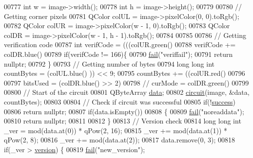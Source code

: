 \begin{DoxyCode}
00777     \textcolor{keywordtype}{int} w = image->width();
00778     \textcolor{keywordtype}{int} h = image->height();
00779 
00780     \textcolor{comment}{// Getting corner pixels}
00781     QColor colUL = image->pixelColor(0, 0).toRgb();
00782     QColor colUR = image->pixelColor(w - 1, 0).toRgb();
00783     QColor colDR = image->pixelColor(w - 1, h - 1).toRgb();
00784 
00785 
00786     \textcolor{comment}{// Getting verification code}
00787     \textcolor{keywordtype}{int} verifCode = (((colUR.green() %
00788     verifCode += colDR.blue() %
00789     \textcolor{keywordflow}{if}(verifCode != 166)\{
00790         \hyperlink{class_model_p_c_a47464b59b7e37fcee25e55475708aabd}{fail}(\textcolor{stringliteral}{"veriffail"});
00791         \textcolor{keywordflow}{return} \textcolor{keyword}{nullptr};
00792     \}
00793     \textcolor{comment}{// Getting number of bytes}
00794     \textcolor{keywordtype}{long} \textcolor{keywordtype}{long} \textcolor{keywordtype}{int} countBytes = (colUL.blue() %
      )) << 9;
00795     countBytes += ((colUR.red() %
00796 
00797     bitsUsed = (colDR.blue() >> 2) %
00798     \textcolor{comment}{// curMode = colDR.green() %
00799 
00800     \textcolor{comment}{// Start of the circuit}
00801     QByteArray \hyperlink{namespace_errors_dict_setup_af570460846fb9f0c91abd308a095dcdc}{data};
00802     \hyperlink{class_model_p_c_a1d0091062a0c836b283ec2f67411623b}{circuit}(image, &data, countBytes);
00803 
00804     \textcolor{comment}{// Check if circuit was successful}
00805     \textcolor{keywordflow}{if}(!\hyperlink{class_model_p_c_a945ffbbc44a832b953c191debd448f4c}{success})
00806         \textcolor{keywordflow}{return} \textcolor{keyword}{nullptr};
00807     \textcolor{keywordflow}{if}(data.isEmpty())
00808     \{
00809         \hyperlink{class_model_p_c_a47464b59b7e37fcee25e55475708aabd}{fail}(\textcolor{stringliteral}{"noreaddata"});
00810         \textcolor{keywordflow}{return} \textcolor{keyword}{nullptr};
00811 
00812     \}
00813     \textcolor{comment}{// Version check}
00814     \textcolor{keywordtype}{long} \textcolor{keywordtype}{long} \textcolor{keywordtype}{int} \_ver = mod(data.at(0)) * qPow(2, 16);
00815     \_ver += mod(data.at(1)) * qPow(2, 8);
00816     \_ver += mod(data.at(2));
00817     data.remove(0, 3);
00818     \textcolor{keywordflow}{if}(\_ver > \hyperlink{class_model_p_c_a5af48ab89e19be42a94c34ba00249401}{version}) \{
00819         \hyperlink{class_model_p_c_a47464b59b7e37fcee25e55475708aabd}{fail}(\textcolor{stringliteral}{"new\_version"});
}
\end{DoxyCode}
